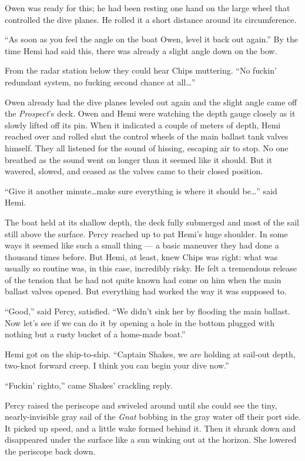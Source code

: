 \documentclass[
]{scrbook}
\begin{document}
Owen was ready for this; he had been resting one hand on the large wheel
that controlled the dive planes. He rolled it a short distance around
its circumference.

``As soon as you feel the angle on the boat Owen, level it back out
again.'' By the time Hemi had said this, there was already a slight
angle down on the bow.

From the radar station below they could hear Chips muttering. ``No
fuckin' redundant system, no fucking second chance at all\ldots{}''

Owen already had the dive planes leveled out again and the slight angle
came off the \emph{Prospect}'s deck. Owen and Hemi were watching the
depth gauge closely as it slowly lifted off its pin. When it indicated a
couple of meters of depth, Hemi reached over and rolled shut the control
wheels of the main ballast tank valves himself. They all listened for
the sound of hissing, escaping air to stop. No one breathed as the sound
went on longer than it seemed like it should. But it wavered, slowed,
and ceased as the valves came to their closed position.

``Give it another minute\ldots make sure everything is where it should
be\ldots{}'' said Hemi.

The boat held at its shallow depth, the deck fully submerged and most of
the sail still above the surface. Percy reached up to pat Hemi's huge
shoulder. In some ways it seemed like such a small thing --- a basic
maneuver they had done a thousand times before. But Hemi, at least, knew
Chips was right: what was usually so routine was, in this case,
incredibly risky. He felt a tremendous release of the tension that he
had not quite known had come on him when the main ballast valves opened.
But everything had worked the way it was supposed to.

``Good,'' said Percy, satisfied. ``We didn't sink her by flooding the
main ballast. Now let's see if we can do it by opening a hole in the
bottom plugged with nothing but a rusty bucket of a home-made boat.''

\bigskip

Hemi got on the ship-to-ship. ``Captain Shakes, we are holding at
sail-out depth, two-knot forward creep. I think you can begin your dive
now.''

``Fuckin' righto,'' came Shakes' crackling reply.

Percy raised the periscope and swiveled around until she could see the
tiny, nearly-invisible gray sail of the \emph{Gnat} bobbing in the gray
water off their port side. It picked up speed, and a little wake formed
behind it. Then it shrank down and disappeared under the surface like a
sun winking out at the horizon. She lowered the periscope back down.
\end{document}
